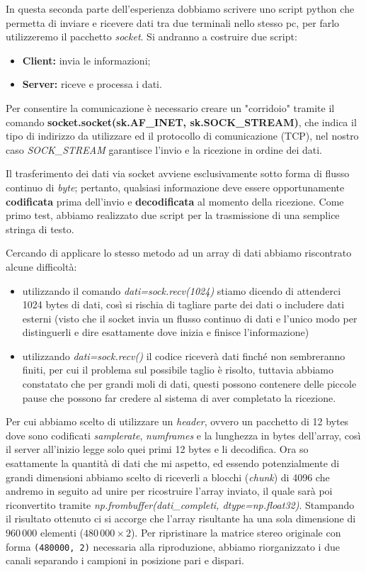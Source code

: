 \documentclass[12pt,a4paper]{article}
\begin{document}
In questa seconda parte dell'esperienza dobbiamo scrivere uno script python che permetta di inviare e ricevere dati tra due terminali nello stesso pc, per farlo utilizzeremo il pacchetto \textit{socket}. Si andranno a costruire due script:
\begin{itemize}
    \item \textbf{Client:} invia le informazioni;
    \item \textbf{Server:} riceve e processa i dati.
\end{itemize}

Per consentire la comunicazione è necessario creare un "corridoio" tramite il comando \textbf{socket.socket(sk.AF\_INET, sk.SOCK\_STREAM)}, che indica il tipo di indirizzo da utilizzare ed il protocollo di comunicazione (TCP), nel nostro caso \textit{SOCK\_STREAM} garantisce l'invio e la ricezione in ordine dei dati.

Il trasferimento dei dati via socket avviene esclusivamente sotto forma di flusso continuo di \textit{byte}; pertanto, qualsiasi informazione deve essere opportunamente \textbf{codificata} prima dell'invio e \textbf{decodificata} al momento della ricezione. Come primo test, abbiamo realizzato due script per la trasmissione di una semplice stringa di testo.

Cercando di applicare lo stesso metodo ad un array di dati abbiamo riscontrato alcune difficoltà:
\begin{itemize}
    \item utilizzando il comando \textit{dati=sock.recv(1024)} stiamo dicendo di attenderci 1024 bytes di dati, così si rischia di tagliare parte dei dati o includere dati esterni (visto che il socket invia un flusso continuo di dati e l'unico modo per distinguerli e dire esattamente dove inizia e finisce l'informazione)
    \item utilizzando \textit{dati=sock.recv()} il codice riceverà dati finché non sembreranno finiti, per cui il problema sul possibile taglio è risolto, tuttavia abbiamo constatato che per grandi moli di dati, questi possono contenere delle piccole pause che possono far credere al sistema di aver completato la ricezione.
\end{itemize}

Per cui abbiamo scelto di utilizzare un \textit{header}, ovvero un pacchetto di 12 bytes dove sono codificati \textit{samplerate}, \textit{numframes} e la lunghezza in bytes dell'array, così il server all'inizio legge solo quei primi 12 bytes e li decodifica. Ora so esattamente la quantità di dati che mi aspetto, ed essendo potenzialmente di grandi dimensioni abbiamo scelto di riceverli a blocchi (\textit{chunk}) di 4096 che andremo in seguito ad unire per ricostruire l'array inviato, il quale sarà poi riconvertito tramite \textit{np.frombuffer(dati\_completi, dtype=np.float32)}. Stampando il risultato ottenuto ci si accorge che l'array risultante ha una sola dimensione di $960\,000$ elementi ($480\,000 \times 2$). Per ripristinare la matrice stereo originale con forma \texttt{(480000, 2)} necessaria alla riproduzione, abbiamo riorganizzato i due canali separando i campioni in posizione pari e dispari.
\end{document}
